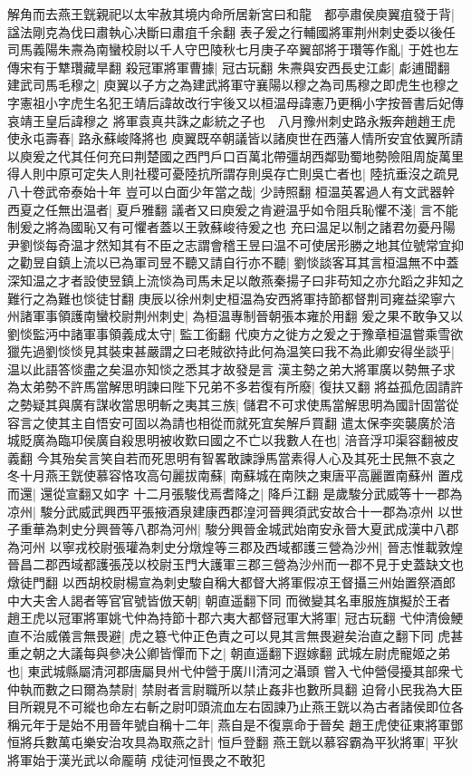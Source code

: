 解角而去燕王皝親祀以太牢赦其境内命所居新宮曰和龍　都亭肅侯庾翼疽發于背|{
	諡法剛克為伐曰肅執心决斷曰肅疽千余翻}
表子爰之行輔國將軍荆州刺史委以後任司馬義陽朱燾為南蠻校尉以千人守巴陵秋七月庚子卒翼部將于瓚等作亂|{
	于姓也左傳宋有于犨瓚藏旱翻}
殺冠軍將軍曹據|{
	冠古玩翻}
朱燾與安西長史江虨|{
	虨逋聞翻}
建武司馬毛穆之|{
	庾翼以子方之為建武將軍守襄陽以穆之為司馬穆之即虎生也穆之字憲祖小字虎生名犯王靖后諱故改行宇後又以桓温母諱憲乃更稱小字按晉書后妃傳哀靖王皇后諱穆之}
將軍袁真共誅之虨統之子也　八月豫州刺史路永叛奔趙趙王虎使永屯壽春|{
	路永蘇峻降將也}
庾翼既卒朝議皆以諸庾世在西藩人情所安宜依翼所請以庾爰之代其任何充曰荆楚國之西門戶口百萬北帶彊胡西鄰勁蜀地勢險阻周旋萬里得人則中原可定失人則社稷可憂陸抗所謂存則吳存亡則吳亡者也|{
	陸抗垂沒之疏見八十卷武帝泰始十年}
豈可以白面少年當之哉|{
	少詩照翻}
桓温英畧過人有文武器幹西夏之任無出温者|{
	夏戶雅翻}
議者又曰庾爰之肯避温乎如令阻兵恥懼不淺|{
	言不能制爰之將為國恥又有可懼者蓋以王敦蘇峻待爰之也}
充曰温足以制之諸君勿憂丹陽尹劉惔每奇温才然知其有不臣之志謂會稽王昱曰温不可使居形勝之地其位號常宜抑之勸昱自鎮上流以已為軍司昱不聽又請自行亦不聽|{
	劉惔談客耳其言桓温無不中蓋深知温之才者設使昱鎮上流惔為司馬未足以敵燕秦揚子曰非苟知之亦允蹈之非知之難行之為難也惔徒甘翻}
庚辰以徐州刺史桓温為安西將軍持節都督荆司雍益梁寧六州諸軍事領護南蠻校尉荆州刺史|{
	為桓温專制晉朝張本雍於用翻}
爰之果不敢争又以劉惔監沔中諸軍事領義成太守|{
	監工銜翻}
代庾方之徙方之爰之于豫章桓温嘗乘雪欲獵先過劉惔惔見其裝束甚嚴謂之曰老賊欲持此何為温笑曰我不為此卿安得坐談乎|{
	温以此語答惔盡之矣温亦知惔之悉其才故發是言}
漢主勢之弟大將軍廣以勢無子求為太弟勢不許馬當解思明諫曰陛下兄弟不多若復有所廢|{
	復扶又翻}
將益孤危固請許之勢疑其與廣有謀收當思明斬之夷其三族|{
	儲君不可求使馬當解思明為國計固當從容言之使其主自悟安可固以為請也相從而就死宜矣解戶買翻}
遣太保李奕襲廣於涪城貶廣為臨卭侯廣自殺思明被收歎曰國之不亡以我數人在也|{
	涪音浮卭渠容翻被皮義翻}
今其殆矣言笑自若而死思明有智畧敢諫諍馬當素得人心及其死士民無不哀之冬十月燕王皝使慕容恪攻高句麗拔南蘇|{
	南蘇城在南陜之東唐平高麗置南蘇州}
置戍而還|{
	還從宣翻又如字}
十二月張駿伐焉耆降之|{
	降戶江翻}
是歲駿分武威等十一郡為凉州|{
	駿分武威武興西平張掖酒泉建康西郡湟河晉興須武安故合十一郡為凉州}
以世子重華為刺史分興晉等八郡為河州|{
	駿分興晉金城武始南安永晉大夏武成漢中八郡為河州}
以寧戎校尉張瓘為刺史分燉煌等三郡及西域都護三營為沙州|{
	晉志惟載敦煌晉昌二郡西域都護張茂以校尉玉門大護軍三郡三營為沙州而一郡不見于史蓋缺文也燉徒門翻}
以西胡校尉楊宣為刺史駿自稱大都督大將軍假凉王督攝三州始置祭酒郎中大夫舍人謁者等官官號皆倣天朝|{
	朝直遥翻下同}
而微變其名車服旌旗擬於王者　趙王虎以冠軍將軍姚弋仲為持節十郡六夷大都督冠軍大將軍|{
	冠古玩翻}
弋仲清儉鯁直不治威儀言無畏避|{
	虎之簒弋仲正色責之可以見其言無畏避矣治直之翻下同}
虎甚重之朝之大議每與參决公卿皆憚而下之|{
	朝直遥翻下遐嫁翻}
武城左尉虎寵姬之弟也|{
	東武城縣屬清河郡唐屬貝州弋仲營于廣川清河之灄頭}
嘗入弋仲營侵擾其部衆弋仲執而數之曰爾為禁尉|{
	禁尉者言尉職所以禁止姦非也數所具翻}
迫脅小民我為大臣目所親見不可縱也命左右斬之尉叩頭流血左右固諫乃止燕王皝以為古者諸侯即位各稱元年于是始不用晉年號自稱十二年|{
	燕自是不復禀命于晉矣}
趙王虎使征東將軍鄧恒將兵數萬屯樂安治攻具為取燕之計|{
	恒戶登翻}
燕王皝以慕容霸為平狄將軍|{
	平狄將軍始于漢光武以命龎萌}
戍徒河恒畏之不敢犯

